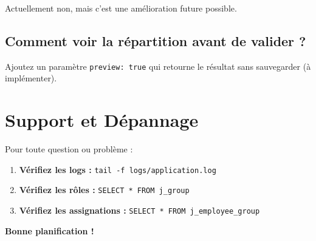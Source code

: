 \documentclass[11pt,a4paper]{article}
\begin{document}
    Actuellement non, mais c'est une amélioration future possible.

    \subsection{Comment voir la répartition avant de valider ?}

    Ajoutez un paramètre \texttt{preview: true} qui retourne le résultat sans sauvegarder (à implémenter).

    \section{Support et Dépannage}

    Pour toute question ou problème :

    \begin{enumerate}
        \item \textbf{Vérifiez les logs :} \texttt{tail -f logs/application.log}
        \item \textbf{Vérifiez les rôles :} \texttt{SELECT * FROM j\_group}
        \item \textbf{Vérifiez les assignations :} \texttt{SELECT * FROM j\_employee\_group}
    \end{enumerate}

    \vspace{1cm}

    \begin{center}
        \Large\textbf{Bonne planification !}
    \end{center}
\end{document}
